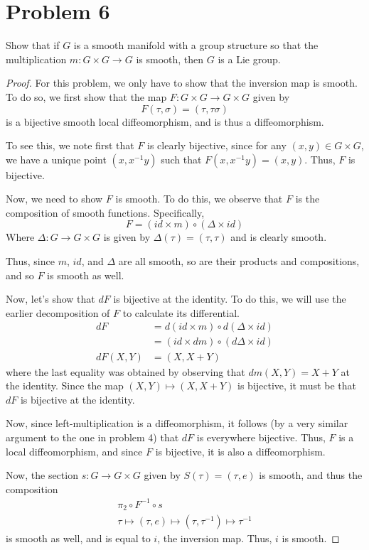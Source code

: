 \documentclass[fontsize=11pt]{scrartcl} %
\numberwithin{equation}{section} %
\numberwithin{figure}{section} %
\numberwithin{table}{section} %
\begin{document}
\newpage

\section*{Problem 6}
Show that if $G$ is a smooth manifold with a group structure so that the
multiplication $m:G\times G\to G$ is smooth, then $G$ is a Lie group.
\\
\begin{proof}
For this problem, we only have to show that the inversion map is smooth. To do
    so, we first show that the map $F:G\times G\to G\times G$ given by
    \[
        F(\tau,\sigma)=(\tau,\tau\sigma)
    \]
    is a bijective smooth local diffeomorphism, and is thus a diffeomorphism.

    To see this, we note first that $F$ is clearly bijective, since for any
    $(x,y)\in G\times G$, we have a unique point $(x,x^{-1}y)$ such that
    $F(x,x^{-1}y) = (x,y)$. Thus, $F$ is bijective.

    Now, we need to show $F$ is smooth. To do this, we observe that $F$ is the
    composition of smooth functions. Specifically,
    \[
        F = (id\times m)\circ (\Delta\times id)
    \]
    Where $\Delta:G\to G\times G$ is given by $\Delta(\tau) = (\tau,\tau)$ and
    is clearly smooth.

    Thus, since $m$, $id$, and $\Delta$ are all smooth, so are their products
    and compositions, and so $F$ is smooth as well.

    Now, let's show that $dF$ is bijective at the identity. To do this, we will
    use the earlier decomposition of $F$ to calculate its differential.
    \[
        \begin{aligned}
            dF &= d(id\times m)\circ d(\Delta\times id)\\
            &= (id\times dm)\circ (d\Delta\times id)\\
            dF(X,Y) &= (X,X+Y)
        \end{aligned}
    \]
    where the last equality was obtained by observing that $dm(X,Y) = X+Y$ at
    the identity. Since the map $(X,Y)\mapsto(X,X+Y)$ is bijective, it must be
    that $dF$ is bijective at the identity.

    Now, since left-multiplication is a diffeomorphism, it follows (by a very
    similar argument to the one in problem 4) that $dF$ is everywhere bijective.
    Thus, $F$ is a local diffeomorphism, and since $F$ is bijective, it is also
    a diffeomorphism.

    Now, the section $s:G\to G\times G$ given by $S(\tau)=(\tau,e)$ is smooth,
    and thus the composition
    \[
        \begin{aligned}
            \pi_2\circ F^{-1}\circ s\\
            \tau\mapsto(\tau,e)\mapsto(\tau,\tau^{-1})\mapsto\tau^{-1}
        \end{aligned}
    \]
    is smooth as well, and is equal to $i$, the inversion map. Thus, $i$ is
    smooth.
\end{proof}
\end{document}
